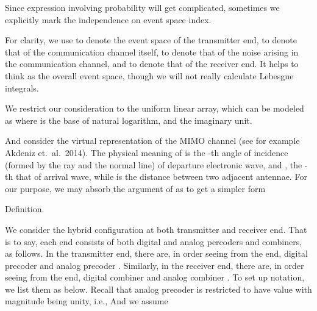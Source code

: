 \startchapter [title={Problem Setting}]

\startsection [title={Channel Model}]

Since expression involving probability will get complicated, sometimes we explicitly mark the independence on event space index.

For clarity, we use  to denote the event space of the transmitter end,  to denote that of the communication channel itself,  to denote that of the noise arising in the communication channel, and  to denote that of the receiver end.
It helps to think  as the overall event space, though we will not really calculate Lebesgue integrals.

We restrict our consideration to the uniform linear array, which can be modeled as
where  is the base of natural logarithm, and  the imaginary unit.

And consider the virtual representation of the MIMO channel (see for example Akdeniz et.\ al.\ 2014).
The physical meaning of  is the -th angle of incidence (formed by the ray and the normal line) of departure electronic wave, and , the -th that of arrival wave, while  is the distance between two adjacent antennae.
For our purpose, we may absorb the argument of  as
to get a simpler form

\Result
{Definition.}
{
}

\stopsection



\startsection [title={System Model}]

We consider the hybrid configuration at both transmitter and receiver end.
That is to say, each end consists of both digital and analog percoders and combiners, as follows.
In the transmitter end, there are, in order seeing from the end, digital precoder  and analog precoder .
Similarly, in the receiver end, there are, in order seeing from the end, digital combiner  and analog combiner .
To set up notation, we list them as below.
Recall that analog precoder is restricted to have value with magnitude being unity, i.e.,
And we assume

